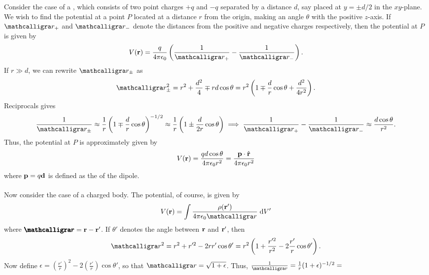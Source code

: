 Consider the case of a , which consists of two point charges $+q$ and $-q$ separated by a distance $d$, say placed at $y = \pm d/2$ in the $xy$-plane. We wish to find the potential at a point $P$ located at a distance $r$ from the origin, making an angle $\theta$ with the positive $z$-axis. If $\curs{r}_{+}$ and $\curs{r}_{-}$ denote the distances from the positive and negative charges respectively, then the potential at $P$ is given by
\begin{align}
    V(\bv{r}) = \frac{q}{4 \pi \epsilon_{0}} \left( \frac{1}{\curs{r}_{+}} - \frac{1}{\curs{r}_{-}} \right).
\end{align}
If $r \gg d$, we can rewrite $\curs{r}_{\pm}$ as
\begin{align}
    \curs{r}_{\pm}^{2} = r^{2} + \frac{d^{2}}{4} \mp r d \cos \theta = r^{2} \left( 1 \mp \frac{d}{r} \cos \theta + \frac{d^{2}}{4 r^{2}} \right).
\end{align}
Reciprocals gives
\begin{align}
    \frac{1}{\curs{r}_{\pm}} \approx \frac{1}{r} \left( 1 \mp \frac{d}{r} \cos \theta \right)^{-1/2} \approx \frac{1}{r} \left( 1 \pm \frac{d}{2r} \cos \theta \right) \implies \frac{1}{\curs{r}_{+}} - \frac{1}{\curs{r}_{-}} \approx \frac{d \cos \theta}{r^{2}}.
\end{align}
Thus, the potential at $P$ is approximately given by
\begin{align}
    V(\mathbf{r}) = \frac{q d \cos \theta}{4 \pi \epsilon_{0} r^{2}} = \frac{\mathbf{p} \cdot \hat{\mathbf{r}}}{4 \pi \epsilon_{0} r^{2}}
\end{align}
where $\mathbf{p} = q \mathbf{d}$ is defined as the  of the dipole.
\\ \\
Now consider the case of a charged body. The potential, of course, is given by
\begin{align}
    V(\bv{r}) = \int \frac{\rho(\bv{r}')}{4 \pi \epsilon_{0} \curs{r}} \; \di{V'}
\end{align}
where $\bcurs{r} = \bv{r} - \bv{r}'$. If $\theta'$ denotes the angle between $\mathbf{r}$ and $\mathbf{r}'$, then
\begin{align}
    \curs{r}^{2} = r^{2} + r'^{2} - 2rr' \cos \theta' = r^{2} \left( 1 + \frac{r'^{2}}{r^{2}} - 2 \frac{r'}{r} \cos \theta' \right).
\end{align}
Now define $\epsilon = (\frac{r'}{r})^{2} - 2(\frac{r'}{r}) \cos \theta'$, so that $\curs{r} = \sqrt{1 + \epsilon}$. Thus, $\frac{1}{\curs{r}} = \frac{1}{r} ( 1 + \epsilon)^{-1/2} =$
